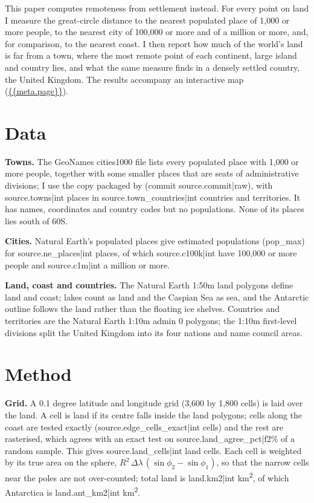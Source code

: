\documentclass[11pt,a4paper]{article}
\begin{document}
This paper computes remoteness from settlement instead. For every point on land I measure the great-circle distance to the nearest populated place of 1,000 or more people, to the nearest city of 100,000 or more and of a million or more, and, for comparison, to the nearest coast. I then report how much of the world's land is far from a town, where the most remote point of each continent, large island and country lies, and what the same measure finds in a densely settled country, the United Kingdom. The results accompany an interactive map (\url{{{meta.page}}}).

\section{Data}
\textbf{Towns.} The GeoNames cities1000 file \citep{geonames} lists every populated place with 1,000 or more people, together with some smaller places that are seats of administrative divisions; I use the copy packaged by \citet{citiesjson} (commit {{source.commit|raw}}), with {{source.towns|int}} places in {{source.town_countries|int}} countries and territories. It has names, coordinates and country codes but no populations. None of its places lies south of 60\textdegree S.

\textbf{Cities.} Natural Earth's populated places \citep{naturalearth} give estimated populations (pop\_max) for {{source.ne_places|int}} places, of which {{source.c100k|int}} have 100,000 or more people and {{source.c1m|int}} a million or more.

\textbf{Land, coast and countries.} The Natural Earth 1:50m land polygons define land and coast; lakes count as land and the Caspian Sea as sea, and the Antarctic outline follows the land rather than the floating ice shelves. Countries and territories are the Natural Earth 1:10m admin 0 polygons; the 1:10m first-level divisions split the United Kingdom into its four nations and name council areas.

\section{Method}
\textbf{Grid.} A 0.1 degree latitude and longitude grid (3,600 by 1,800 cells) is laid over the land. A cell is land if its centre falls inside the land polygons; cells along the coast are tested exactly ({{source.edge_cells_exact|int}} cells) and the rest are rasterised, which agrees with an exact test on {{source.land_agree_pct|f2}}\% of a random sample. This gives {{source.land_cells|int}} land cells. Each cell is weighted by its true area on the sphere, $R^2\,\Delta\lambda\,(\sin\phi_2-\sin\phi_1)$, so that the narrow cells near the poles are not over-counted; total land is {{land.km2|int}} km\textsuperscript{2}, of which Antarctica is {{land.ant_km2|int}} km\textsuperscript{2}.
\end{document}
